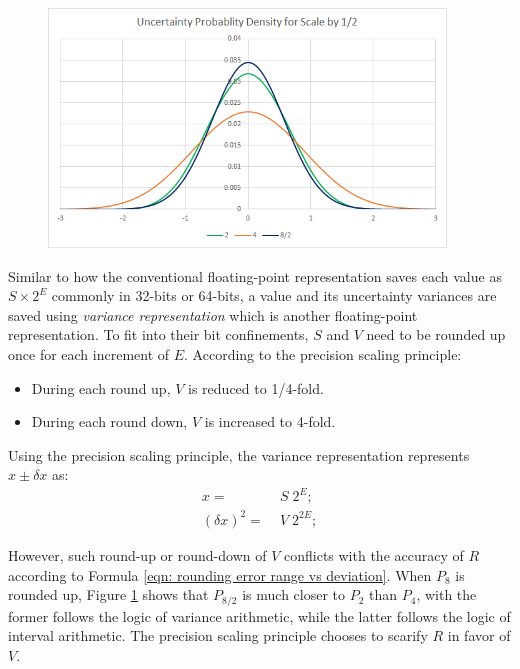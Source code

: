 \documentclass[twoside]{article}
\numberwithin{equation}{section}
\begin{document}
\begin{figure}%
\centering
\includegraphics[height=2.5in]{Prec_RndByDev_Dist.png} 
\label{fig: Prec_RndByDev_Dist}
\end{figure}

Similar to how the conventional floating-point representation \cite{Floating_Point_Standard} saves each value as $S\times 2^E$ commonly in 32-bits or 64-bits, a value and its uncertainty variances are saved using \emph{variance representation} which is another floating-point representation.
To fit into their bit confinements, $S$ and $V$ need to be rounded up once for each increment of $E$.
According to the precision scaling principle:
\begin{itemize}
\item During each round up, $V$ is reduced to 1/4-fold. 

\item During each round down, $V$ is increased to 4-fold.
\end{itemize}
Using the precision scaling principle, the variance representation represents $x \pm \delta x$ as:
\begin{align}
\label{eqn: accurate value}
x =&\; S \; 2^{E};\\
\label{eqn: uncertainty variance}
(\delta x)^2 =&\; V \; 2^{2E};
\end{align}

However, such round-up or round-down of $V$ conflicts with the accuracy of $R$ according to Formula \eqref{eqn: rounding error range vs deviation}.
When $P_8$ is rounded up, Figure \ref{fig: Prec_RndByDev_Dist} shows that $P_{8/2}$ is much closer to $P_2$ than $P_4$, with the former follows the logic of variance arithmetic, while the latter follows the logic of interval arithmetic. 
The precision scaling principle chooses to scarify $R$ in favor of $V$.
\end{document}

